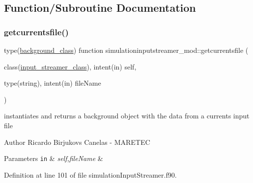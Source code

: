 \subsection{Function/\+Subroutine Documentation}
\mbox{\label{namespacesimulationinputstreamer__mod_af1f989baa363031aac274694aeacfad5}} 
\subsubsection{\texorpdfstring{getcurrentsfile()}{getcurrentsfile()}}
{\footnotesize\ttfamily type(\mbox{\hyperlink{structbackground__mod_1_1background__class}{background\+\_\+class}}) function simulationinputstreamer\+\_\+mod\+::getcurrentsfile (\begin{DoxyParamCaption}\item[{class(\mbox{\hyperlink{structsimulationinputstreamer__mod_1_1input__streamer__class}{input\+\_\+streamer\+\_\+class}}), intent(in)}]{self,  }\item[{type(string), intent(in)}]{file\+Name }\end{DoxyParamCaption})\hspace{0.3cm}{\ttfamily [private]}}



instantiates and returns a background object with the data from a currents input file 

\begin{DoxyAuthor}{Author}
Ricardo Birjukovs Canelas -\/ M\+A\+R\+E\+T\+EC 
\end{DoxyAuthor}

\begin{DoxyParams}[1]{Parameters}
\mbox{\tt in}  & {\em self,file\+Name} & \\
\hline
\end{DoxyParams}


Definition at line 101 of file simulation\+Input\+Streamer.\+f90.


